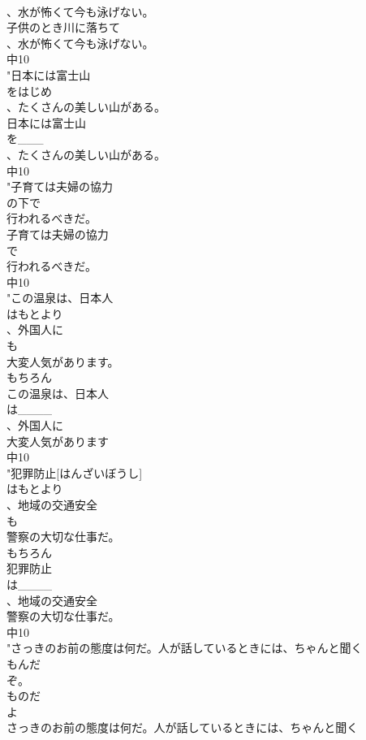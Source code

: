 \documentclass[8pt]{extreport}
\begin{document}
\begin{CJK}{UTF8}{min}
\\	、水が怖くて今も泳げない。
\\	子供のとき川に落ちて
\\	、水が怖くて今も泳げない。
\\	中10
\\	"日本には富士山
\\	をはじめ
\\	、たくさんの美しい山がある。
\\	日本には富士山
\\	を___
\\	、たくさんの美しい山がある。
\\	中10
\\	"子育ては夫婦の協力
\\	の下で
\\	行われるべきだ。
\\	子育ては夫婦の協力
\\	で
\\	行われるべきだ。
\\	中10
\\	"この温泉は、日本人
\\	はもとより
\\	、外国人に
\\	も
\\	大変人気があります。
\\	もちろん	
\\	この温泉は、日本人
\\	は____
\\	、外国人に
\\	大変人気があります
\\	中10
\\	"犯罪防止[はんざいぼうし]
\\	はもとより
\\	、地域の交通安全
\\	も
\\	警察の大切な仕事だ。
\\	もちろん	
\\	犯罪防止
\\	は____
\\	、地域の交通安全
\\	警察の大切な仕事だ。
\\	中10
\\	"さっきのお前の態度は何だ。人が話しているときには、ちゃんと聞く
\\	もんだ
\\	ぞ。
\\	ものだ
\\	よ
\\	さっきのお前の態度は何だ。人が話しているときには、ちゃんと聞く

\end{CJK}
\end{document}
